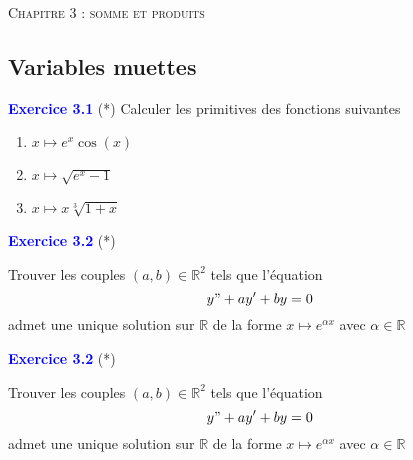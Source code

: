 \documentclass[a4paper,10pt]{article}
\renewcommand{\footrulewidth}{0.5pt} %
\begin{document}
 
\begin{multicols}{4}

\begin{center}\textsc{{\huge Chapitre 3 : somme et produits}}\end{center}

\chead{}\renewcommand{\headrulewidth}{0.4pt}\renewcommand{\footrulewidth}{0.4pt}



\subsection*{Variables muettes}

\textcolor{blue}{\large{\bf Exercice 3.1}} (*)
Calculer les primitives des fonctions suivantes
 
\begin{enumerate}
\item $x \mapsto e^{x} \cos(x)$
\item $x \mapsto \sqrt{e^x-1}$
\item $x \mapsto x \sqrt[3]{1+x}$
\end{enumerate}

\textcolor{blue}{\large{\bf Exercice 3.2}} (*)

Trouver les couples $(a,b) \in \mathbb{R}^2$ tels que l'équation
$$ y" + a y' + by = 0 $$ admet une unique solution sur $\mathbb{R}$ de la forme $x \mapsto e^{\alpha x}$ avec $\alpha \in \mathbb{R}$

\textcolor{blue}{\large{\bf Exercice 3.2}} (*)

Trouver les couples $(a,b) \in \mathbb{R}^2$ tels que l'équation
$$ y" + a y' + by = 0 $$ admet une unique solution sur $\mathbb{R}$ de la forme $x \mapsto e^{\alpha x}$ avec $\alpha \in \mathbb{R}$

\end{multicols}
\end{document}
